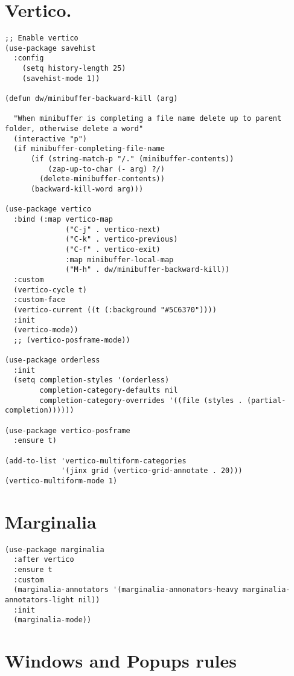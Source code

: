 \documentclass[11pt]{article}
\begin{document}
\section{Vertico.}
\label{sec:orgcaf4dfc}
\begin{verbatim}
;; Enable vertico
(use-package savehist
  :config
    (setq history-length 25)
    (savehist-mode 1))

(defun dw/minibuffer-backward-kill (arg)

  "When minibuffer is completing a file name delete up to parent
folder, otherwise delete a word"
  (interactive "p")
  (if minibuffer-completing-file-name
      (if (string-match-p "/." (minibuffer-contents))
          (zap-up-to-char (- arg) ?/)
        (delete-minibuffer-contents))
      (backward-kill-word arg)))

(use-package vertico
  :bind (:map vertico-map
              ("C-j" . vertico-next)
              ("C-k" . vertico-previous)
              ("C-f" . vertico-exit)
              :map minibuffer-local-map
              ("M-h" . dw/minibuffer-backward-kill))
  :custom
  (vertico-cycle t)
  :custom-face
  (vertico-current ((t (:background "#5C6370"))))
  :init
  (vertico-mode))
  ;; (vertico-posframe-mode))

(use-package orderless
  :init
  (setq completion-styles '(orderless)
        completion-category-defaults nil
        completion-category-overrides '((file (styles . (partial-completion))))))

(use-package vertico-posframe
  :ensure t)

(add-to-list 'vertico-multiform-categories
             '(jinx grid (vertico-grid-annotate . 20)))
(vertico-multiform-mode 1)
\end{verbatim}
\section{Marginalia}
\label{sec:orgfbd59e7}
\begin{verbatim}
(use-package marginalia
  :after vertico
  :ensure t
  :custom
  (marginalia-annotators '(marginalia-annonators-heavy marginalia-annotators-light nil))
  :init
  (marginalia-mode))
\end{verbatim}
\section{Windows and Popups rules}
\label{sec:org6e881a2}
\end{document}
